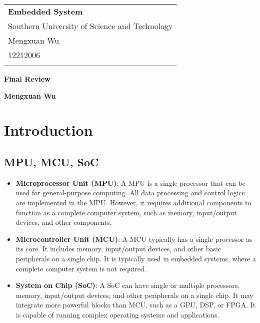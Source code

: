 \documentclass[a4paper,12pt]{article}
\begin{document}
\thispagestyle{empty} %

\begin{tabular}{p{15.5cm}}
{\large \bf Embedded System} \\
Southern University of Science and Technology \\ Mengxuan Wu \\ 12212006 \\
\hline
\\
\end{tabular}

\vspace*{0.3cm} %

\begin{center}
	{\Large \bf Final Review}
	\vspace{2mm}

	{\bf Mengxuan Wu}
		
\end{center}  

\vspace*{0.4cm} 

\section{Introduction}

\subsection{MPU, MCU, SoC}

\begin{itemize}
	\item \textbf{Microprocessor Unit (MPU)}: A MPU is a single processor that can be used for general-purpose computing. All data processing and control logics are implemented in the MPU. However, it requires additional components to function as a complete computer system, such as memory, input/output devices, and other components.
	
	\item \textbf{Microcontroller Unit (MCU)}: A MCU typically has a single processor as its core. It includes memory, input/output devices, and other basic peripherals on a single chip. It is typically used in embedded systems, where a complete computer system is not required. 
	
	\item \textbf{System on Chip (SoC)}: A SoC can have single or multiple processors, memory, input/output devices, and other peripherals on a single chip. It may integrate more powerful blocks than MCU, such as a GPU, DSP, or FPGA. It is capable of running complex operating systems and applications.
\end{itemize}
\end{document}
